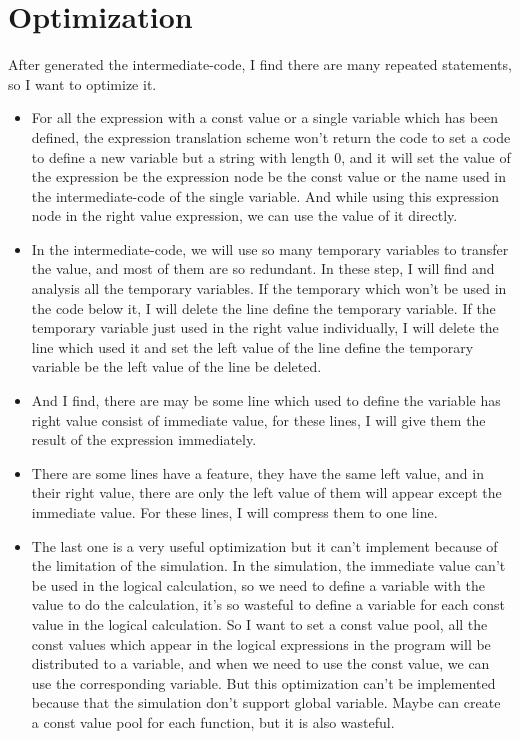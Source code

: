 \documentclass{article}
\begin{document}
    \section{Optimization}
        After generated the intermediate-code, I find there are many repeated statements, so I want to optimize it.
        \begin{itemize}
            \item For all the expression with a const value or a single variable which has been defined, the expression translation scheme won't return the code to set a code 
            to define a new variable but a string with length 0, and it will set the value of the expression be the expression node be the const value or the name used in the 
            intermediate-code of the single variable. And while using this expression node in the right value expression, we can use the value of it directly.
            \item In the intermediate-code, we will use so many temporary variables to transfer the value, and most of them are so redundant. In these step, I will find and
            analysis all the temporary variables. If the temporary which won't be used in the code below it, I will delete the line define the temporary variable. If the 
            temporary variable just used in the right value individually, I will delete the line which used it and set the left value of the line define the temporary variable
            be the left value of the line be deleted.
            \item And I find, there are may be some line which used to define the variable has right value consist of immediate value, for these lines, I will give them the result
            of the expression immediately.
            \item There are some lines have a feature, they have the same left value, and in their right value, there are only the left value of them will appear except the immediate
            value. For these lines, I will compress them to one line.
            \item The last one is a very useful optimization but it can't implement because of the limitation of the simulation. In the simulation, the immediate value can't be used
            in the logical calculation, so we need to define a variable with the value to do the calculation, it's so wasteful to define a variable for each const value in the
            logical calculation. So I want to set a const value pool, all the const values which appear in the logical expressions in the program will be distributed to a variable, and
            when we need to use the const value, we can use the corresponding variable. But this optimization can't be implemented because that the simulation don't support global
            variable. Maybe can create a const value pool for each function, but it is also wasteful.
        \end{itemize}
\end{document}
